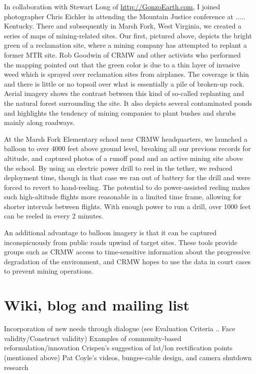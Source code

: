 \documentclass[11pt]{report}
\begin{document}
In collaboration with Stewart Long of \url{http://GonzoEarth.com}, I joined photographer Chris Eichler in attending the Mountain Justice conference at ..... Kentucky. There and subsequently in Marsh Fork, West Virginia, we created a series of maps of mining-related sites. Our first, pictured above, depicts the bright green of a reclamation site, where a mining company has attempted to replant a former MTR site. Rob Goodwin of CRMW and other activists who performed the mapping pointed out that the green color is due to a thin layer of invasive weed which is sprayed over reclamation sites from airplanes. The coverage is thin and there is little or no topsoil over what is essentially a pile of broken-up rock. Aerial imagery shows the contrast between this kind of so-called replanting and the natural forest surrounding the site. It also depicts several contaminated ponds and highlights the tendency of mining companies to plant bushes and shrubs mainly along roadways. 

At the Marsh Fork Elementary school near CRMW headquarters, we launched a balloon to over 4000 feet above ground level, breaking all our previous records for altitude, and captured photos of a runoff pond and an active mining site above the school. By using an electric power drill to reel in the tether, we reduced deployment time, though in that case we ran out of battery for the drill and were forced to revert to hand-reeling. The potential to do power-assisted reeling makes such high-altitude flights more reasonable in a limited time frame, allowing for shorter intervals between flights. With enough power to run a drill, over 1000 feet can be reeled in every 2 minutes. 

An additional advantage to balloon imagery is that it can be captured inconspicuously from public roads upwind of target sites. These tools provide groups such as CRMW access to time-sensitive information about the progressive degradation of the environment, and CRMW hopes to use the data in court cases to prevent mining operations.

\section{Wiki, blog and mailing list}
        Incorporation of new needs through dialogue (see Evaluation Criteria .. Face validity/Construct validity)
        Examples of community-based reformulation/innovation
            Crispen's suggestion of lat/lon rectification points (mentioned above)
            Pat Coyle's videos, bungee-cable design, and camera shutdown research
\end{document}
